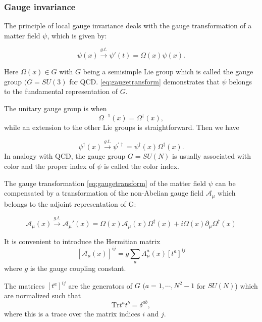 \subsubsection{Gauge invariance}
The principle of local gauge invariance deals with the gauge transformation of
a matter field $\psi$, which is given by:

\begin{equation}
  \psi(x)\xrightarrow{g.t.}\psi'(t) = \Omega(x)\psi(x).
  \label{eq:gaugetransform}
\end{equation}

Here $\Omega(x)\in G$ with $G$ being a semisimple Lie group which is called the
gauge group $(G=SU(3)$ for QCD. \eqref{eq:gaugetransform} demonstrates
that $\psi$ belongs to the fundamental representation of $G$.
\par The unitary gauge group is when
\begin{equation}
  \Omega^{-1}(x) = \Omega^\dagger(x),
\end{equation}
while an extension to the other Lie groups is straightforward. 
Then we have

\begin{equation}
  \psi^\dagger(x) \xrightarrow{g.t.} \psi^{'\dagger}
  = \psi^\dagger(x)\Omega^\dagger(x).
\end{equation}
In analogy with QCD, the gauge group $G=SU(N)$ is usually associated with color
and the proper index of $\psi$ is called the color index.
\par The gauge transformation \eqref{eq:gaugetransform} of the matter field
$\psi$ can be compensated by a transformation of the non-Abelian gauge field
$\mathcal{A}_\mu$ which belongs to the adjoint representation of G:

\begin{equation}
  \mathcal{A}_\mu(x)\xrightarrow{g.t.}\mathcal{A}_\mu'(x)
  = \Omega(x)\mathcal{A}_\mu(x)\Omega^\dagger(x)
  + i\Omega(x)\partial_\mu\Omega^\dagger(x)
  \label{eq:nonabeliangaugetransform}
\end{equation}

It is convenient to introduce the Hermitian matrix
\begin{equation}
  \left[\mathcal{A}_\mu(x)\right]^{ij}
  = g\sum_a{A^a_\mu(x)\left[t^a\right]^{ij}}
  \label{eq:hermitianmatrix}
\end{equation}
where $g$ is the gauge coupling constant.
\par The matrices $[t^a]^{ij}$ are the generators of $G$ $(a=1,\cdots,N^2-1$
for $SU(N)$) which are normalized such that
\begin{equation}
  \mathrm{Tr}t^at^b = \delta^{ab},
\end{equation}
where this is a trace over the matrix indices $i$ and $j$.

